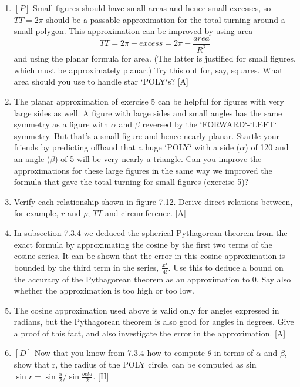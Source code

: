 \documentclass{book}
\begin{document}
\begin{enumerate}
\item $[P]$ Small figures should have small areas and hence small excesses,
so $TT = 2 \pi $ should be a passable approximation for the total turning
around a small polygon. This approximation can be improved by using
area
$$TT = 2 \pi - excess = 2 \pi - \frac{area}{R^2}$$
and using the planar formula for area. (The latter is justified for small
figures, which must be approximately planar.) Try this out for, say,
squares. What area should you use to handle star \textsc{`POLY`}s? [A]

\item The planar approximation of exercise 5 can be helpful for figures with
very large sides as well. A figure with large sides and small angles has the
same symmetry as a figure with $\alpha$ and $\beta$ reversed by the \textsc{`FORWARD`}-\textsc{`LEFT`}
symmetry. But that's a small figure and hence nearly planar. Startle
your friends by predicting offhand that a huge \textsc{`POLY`} with a side ($\alpha$) of
120 and an angle ($\beta$) of 5 will be very nearly a triangle. Can you improve
the approximations for these large figures in the same way we improved
the formula that gave the total turning for small figures (exercise 5)?

\item Verify each relationship shown in figure 7.12. Derive direct relations
between, for example, $r$ and $\rho$; $TT$ and circumference. [A]

\item In subsection 7.3.4 we deduced the spherical Pythagorean theorem
from the exact formula by approximating the cosine by the first two
terms of the cosine series. It can be shown that the error in this cosine
approximation is bounded by the third term in the series, $\frac {x^4}{4!}$. Use
this to deduce a bound on the accuracy of the Pythagorean theorem as
an approximation to 0. Say also whether the approximation is too high
or too low.

\item The cosine approximation used above is valid only for angles expressed
in radians, but the Pythagorean theorem is also good for angles in
degrees. Give a proof of this fact, and also investigate the error in the
approximation. [A]

\item $[D]$ Now that you know from 7.3.4 how to compute $\theta$ in terms of $\alpha$
and $\beta$, show that r, the radius of the POLY circle, can be computed as
sin $\sin r = \sin \frac{\alpha}{2} / \sin \frac{beta}{2} $. [H]


\end{enumerate}
\end{document}
